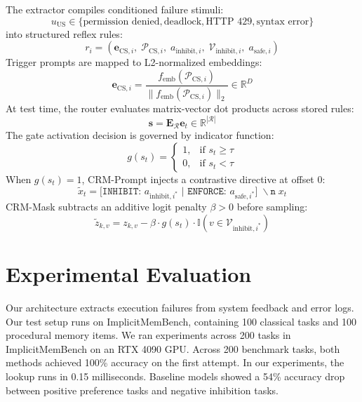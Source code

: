 \documentclass[10pt,conference]{IEEEtran}
\begin{document}
The extractor compiles conditioned failure stimuli:
\begin{equation}
    u_{\text{US}} \in \{\text{permission denied}, \text{deadlock}, \text{HTTP 429}, \text{syntax error}\}
\end{equation}
into structured reflex rules:
\begin{equation}
    r_i = \left(\mathbf{e}_{\text{CS}, i},\; \mathcal{P}_{\text{CS}, i},\; a_{\text{inhibit}, i},\; \mathcal{V}_{\text{inhibit}, i},\; a_{\text{safe}, i}\right)
\end{equation}
Trigger prompts are mapped to L2-normalized embeddings:
\begin{equation}
    \mathbf{e}_{\text{CS}, i} = \frac{f_{\text{emb}}(\mathcal{P}_{\text{CS}, i})}{\|f_{\text{emb}}(\mathcal{P}_{\text{CS}, i})\|_2} \in \mathbb{R}^D
\end{equation}
At test time, the router evaluates matrix-vector dot products across stored rules:
\begin{equation}
    \mathbf{s} = \mathbf{E}_{\mathcal{R}} \mathbf{e}_t \in \mathbb{R}^{|\mathcal{R}|}
\end{equation}
The gate activation decision is governed by indicator function:
\begin{equation}
    g(s_t) = \begin{cases}
        1, & \text{if } s_t \ge \tau \\
        0, & \text{if } s_t < \tau
    \end{cases}
\end{equation}
When $g(s_t) = 1$, CRM-Prompt injects a contrastive directive at offset 0:
\begin{equation}
    \tilde{x}_t = \texttt{[INHIBIT: } a_{\text{inhibit}, i^*} \texttt{ | ENFORCE: } a_{\text{safe}, i^*} \texttt{]}\;\backslash\texttt{n}\;x_t
\end{equation}
CRM-Mask subtracts an additive logit penalty $\beta > 0$ before sampling:
\begin{equation}
    \tilde{z}_{k, v} = z_{k, v} - \beta \cdot g(s_t) \cdot \mathbb{I}\left(v \in \mathcal{V}_{\text{inhibit}, i^*}\right)
\end{equation}



\section{Experimental Evaluation}

Our architecture extracts execution failures from system feedback and error logs. Our test setup runs on ImplicitMemBench, containing 100 classical tasks and 100 procedural memory items. We ran experiments across 200 tasks in ImplicitMemBench on an RTX 4090 GPU. Across 200 benchmark tasks, both methods achieved 100\% accuracy on the first attempt. In our experiments, the lookup runs in 0.15 milliseconds. Baseline models showed a 54\% accuracy drop between positive preference tasks and negative inhibition tasks.
\end{document}
